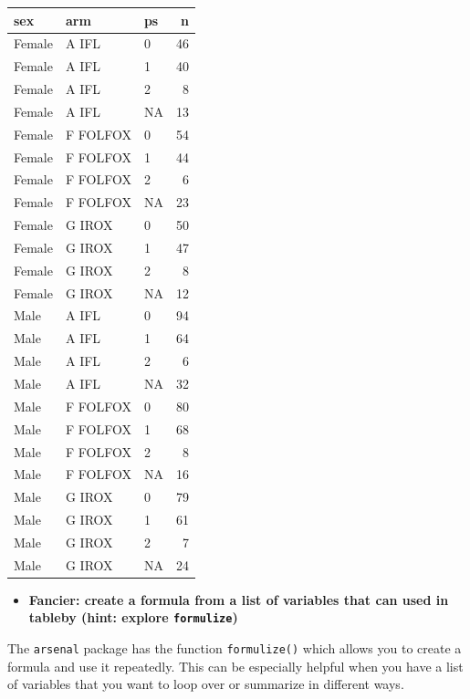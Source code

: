 \documentclass[
]{book}
\providecommand{\tightlist}{%
  \setlength{\itemsep}{0pt}\setlength{\parskip}{0pt}}
\begin{document}
\begin{tabular}{l|l|l|r}
\hline
sex & arm & ps & n\\
\hline
Female & A IFL & 0 & 46\\
\hline
Female & A IFL & 1 & 40\\
\hline
Female & A IFL & 2 & 8\\
\hline
Female & A IFL & NA & 13\\
\hline
Female & F FOLFOX & 0 & 54\\
\hline
Female & F FOLFOX & 1 & 44\\
\hline
Female & F FOLFOX & 2 & 6\\
\hline
Female & F FOLFOX & NA & 23\\
\hline
Female & G IROX & 0 & 50\\
\hline
Female & G IROX & 1 & 47\\
\hline
Female & G IROX & 2 & 8\\
\hline
Female & G IROX & NA & 12\\
\hline
Male & A IFL & 0 & 94\\
\hline
Male & A IFL & 1 & 64\\
\hline
Male & A IFL & 2 & 6\\
\hline
Male & A IFL & NA & 32\\
\hline
Male & F FOLFOX & 0 & 80\\
\hline
Male & F FOLFOX & 1 & 68\\
\hline
Male & F FOLFOX & 2 & 8\\
\hline
Male & F FOLFOX & NA & 16\\
\hline
Male & G IROX & 0 & 79\\
\hline
Male & G IROX & 1 & 61\\
\hline
Male & G IROX & 2 & 7\\
\hline
Male & G IROX & NA & 24\\
\hline
\end{tabular}

\begin{itemize}
\tightlist
\item
  \textbf{Fancier: create a formula from a list of variables that can used in tableby (hint: explore \texttt{formulize})}
\end{itemize}

The \texttt{arsenal} package has the function \texttt{formulize()} which allows you to create a formula and use it repeatedly. This can be especially helpful when you have a list of variables that you want to loop over or summarize in different ways.
\end{document}
